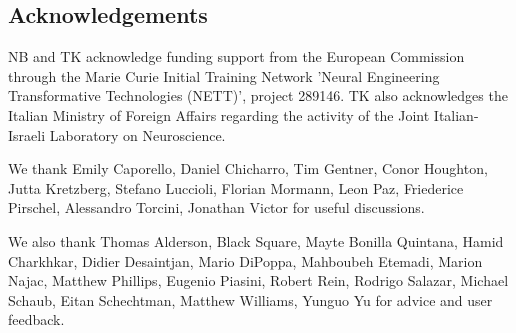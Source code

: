 \documentclass[10pt,twocolumn]{elsart5p}
\begin{document}
\begin{thanks}
\section{\label{s:Acknowledgement} \textbf{Acknowledgements}}
NB and TK acknowledge funding support from the European Commission through the Marie Curie Initial Training Network 'Neural Engineering Transformative Technologies (NETT)', project 289146. TK also acknowledges the Italian Ministry of Foreign Affairs regarding the activity of the Joint Italian-Israeli Laboratory on Neuroscience. 
     
We thank Emily Caporello, Daniel Chicharro, Tim Gentner, Conor Houghton, Jutta Kretzberg, Stefano Luccioli, Florian Mormann, Leon Paz, Friederice Pirschel, Alessandro Torcini, Jonathan Victor for useful discussions.

We also thank Thomas Alderson, Black Square, Mayte Bonilla Quintana, Hamid Charkhkar, Didier Desaintjan, Mario DiPoppa, Mahboubeh Etemadi, Marion Najac, Matthew Phillips, Eugenio Piasini, Robert Rein, Rodrigo Salazar, Michael Schaub, Eitan Schechtman, Matthew Williams, Yunguo Yu for advice and user feedback.
     
\end{thanks}




%

\end{document}
